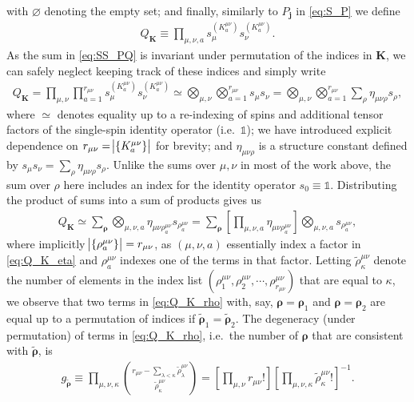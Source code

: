 \documentclass[pra,reprint,longbibliography]{revtex4-1}
\newcommand{\p}[1]{\left(#1\right)} %
\renewcommand{\sp}[1]{\left[#1\right]} %
\renewcommand{\set}[1]{\left\{#1\right\}} %
\renewcommand{\v}{\bm} %
\newcommand{\1}{\mathds{1}}
\begin{document}
with $\varnothing$ denoting the empty set; and finally, similarly to
$P_{\v j}$ in \eqref{eq:S_P} we define
\begin{align}
  Q_{\v K} \equiv \prod_{\mu,\nu,a}
  s_\mu^{(K^{\mu\nu}_a)} s_\nu^{(K^{\mu\nu}_a)}.
\end{align}
As the sum in \eqref{eq:SS_PQ} is invariant under permutation of the
indices in $\v K$, we can safely neglect keeping track of these
indices and simply write
\begin{align}
  Q_{\v K}
  = \prod_{\mu,\nu} \prod_{a=1}^{r_{\mu\nu}}
  s_\mu^{(K^{\mu\nu}_a)} s_\nu^{(K^{\mu\nu}_a)}
  \simeq \bigotimes_{\mu,\nu} \bigotimes_{a=1}^{r_{\mu\nu}} s_\mu s_\nu
  = \bigotimes_{\mu,\nu} \bigotimes_{a=1}^{r_{\mu\nu}}
  \sum_\rho \eta_{\mu\nu\rho} s_\rho,
  \label{eq:Q_K_eta}
\end{align}
where $\simeq$ denotes equality up to a re-indexing of spins and
additional tensor factors of the single-spin identity operator
(i.e.~$\1$); we have introduced explicit dependence on
$r_{\mu\nu}=\abs{\set{K^{\mu\nu}_a}}$ for brevity; and
$\eta_{\mu\nu\rho}$ is a structure constant defined by
$s_\mu s_\nu=\sum_\rho\eta_{\mu\nu\rho}s_\rho$.  Unlike the sums over
$\mu,\nu$ in most of the work above, the sum over $\rho$ here includes
an index for the identity operator $s_0\equiv\1$.  Distributing the
product of sums into a sum of products gives us
\begin{align}
  Q_{\v K}
  \simeq \sum_{\v\rho} \bigotimes_{\mu,\nu,a}
  \eta_{\mu\nu\rho^{\mu\nu}_a} s_{\rho^{\mu\nu}_a}
  = \sum_{\v\rho} \sp{\prod_{\mu,\nu,a}\eta_{\mu\nu\rho^{\mu\nu}_a}}
  \bigotimes_{\mu,\nu,a} s_{\rho^{\mu\nu}_a},
  \label{eq:Q_K_rho}
\end{align}
where implicitly $\abs{\set{\rho^{\mu\nu}_a}}=r_{\mu\nu}$, as
$\p{\mu,\nu,a}$ essentially index a factor in \eqref{eq:Q_K_eta} and
$\rho^{\mu\nu}_a$ indexes one of the terms in that factor.  Letting
$\tilde\rho^{\mu\nu}_\kappa$ denote the number of elements in the
index list
$\p{\rho^{\mu\nu}_1,\rho^{\mu\nu}_2,\cdots,\rho^{\mu\nu}_{r_{\mu\nu}}}$
that are equal to $\kappa$, we observe that two terms in
\eqref{eq:Q_K_rho} with, say, $\v\rho=\v\rho_1$ and $\v\rho=\v\rho_2$
are equal up to a permutation of indices if
$\tilde{\v\rho}_1=\tilde{\v\rho}_2$.  The degeneracy (under
permutation) of terms in \eqref{eq:Q_K_rho}, i.e.~the number of
$\v\rho$ that are consistent with $\tilde{\v\rho}$, is
\begin{align}
  g_{\tilde{\v\rho}}
  \equiv \prod_{\mu,\nu,\kappa}
  { r_{\mu\nu} - \sum_{\lambda<\kappa} \tilde\rho^{\mu\nu}_\lambda
    \choose \tilde\rho^{\mu\nu}_\kappa }
  = \sp{\prod_{\mu,\nu} r_{\mu\nu}!}
  \sp{\prod_{\mu,\nu,\kappa} \tilde\rho^{\mu\nu}_\kappa!}^{-1}.
\end{align}
\end{document}
